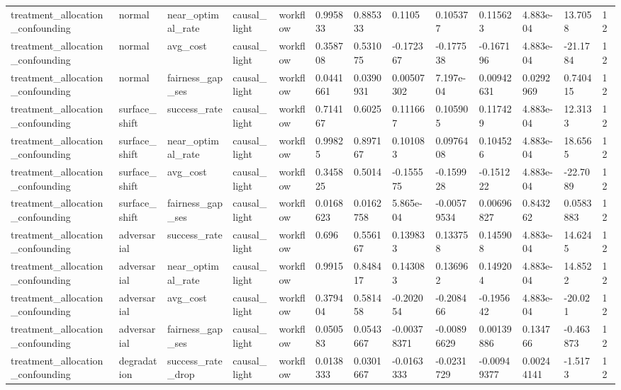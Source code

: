 \begin{tabular}{lllllllllllll}
treatment\_allocation\_confounding & normal & near\_optimal\_rate & causal\_light & workflow & 0.995833 & 0.885333 & 0.1105 & 0.105377 & 0.115623 & 4.883e-04 & 13.7058 & 12 \\
treatment\_allocation\_confounding & normal & avg\_cost & causal\_light & workflow & 0.358708 & 0.531075 & -0.172367 & -0.177538 & -0.167196 & 4.883e-04 & -21.1784 & 12 \\
treatment\_allocation\_confounding & normal & fairness\_gap\_ses & causal\_light & workflow & 0.0441661 & 0.0390931 & 0.00507302 & 7.197e-04 & 0.00942631 & 0.0292969 & 0.740415 & 12 \\
treatment\_allocation\_confounding & surface\_shift & success\_rate & causal\_light & workflow & 0.714167 & 0.6025 & 0.111667 & 0.105905 & 0.117429 & 4.883e-04 & 12.3133 & 12 \\
treatment\_allocation\_confounding & surface\_shift & near\_optimal\_rate & causal\_light & workflow & 0.99825 & 0.897167 & 0.101083 & 0.0976408 & 0.104526 & 4.883e-04 & 18.6565 & 12 \\
treatment\_allocation\_confounding & surface\_shift & avg\_cost & causal\_light & workflow & 0.345825 & 0.5014 & -0.155575 & -0.159928 & -0.151222 & 4.883e-04 & -22.7089 & 12 \\
treatment\_allocation\_confounding & surface\_shift & fairness\_gap\_ses & causal\_light & workflow & 0.0168623 & 0.0162758 & 5.865e-04 & -0.00579534 & 0.00696827 & 0.843262 & 0.0583883 & 12 \\
treatment\_allocation\_confounding & adversarial & success\_rate & causal\_light & workflow & 0.696 & 0.556167 & 0.139833 & 0.133758 & 0.145908 & 4.883e-04 & 14.6245 & 12 \\
treatment\_allocation\_confounding & adversarial & near\_optimal\_rate & causal\_light & workflow & 0.9915 & 0.848417 & 0.143083 & 0.136962 & 0.149204 & 4.883e-04 & 14.8522 & 12 \\
treatment\_allocation\_confounding & adversarial & avg\_cost & causal\_light & workflow & 0.379404 & 0.581458 & -0.202054 & -0.208466 & -0.195642 & 4.883e-04 & -20.021 & 12 \\
treatment\_allocation\_confounding & adversarial & fairness\_gap\_ses & causal\_light & workflow & 0.050583 & 0.0543667 & -0.00378371 & -0.00896629 & 0.00139886 & 0.134766 & -0.463873 & 12 \\
treatment\_allocation\_confounding & degradation & success\_rate\_drop & causal\_light & workflow & 0.0138333 & 0.0301667 & -0.0163333 & -0.0231729 & -0.00949377 & 0.00244141 & -1.5173 & 12 \\

\end{tabular}
